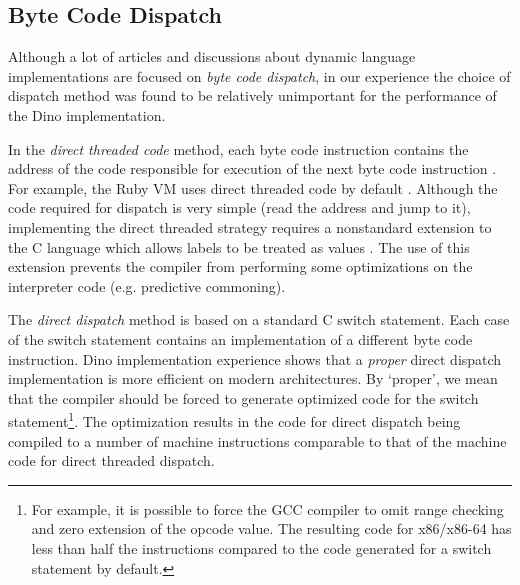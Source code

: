 \documentclass[preprint]{sigplanconf}
\begin{document}
\subsection{Byte Code Dispatch}

  Although a lot of articles and discussions about dynamic language
implementations are focused on \emph{byte code dispatch}, in our experience %
the choice of dispatch
method was found to be relatively unimportant for the performance of the Dino implementation.

  In the \emph{direct threaded code} method, each byte code
instruction contains the address of the code responsible for execution of
the next byte code instruction \cite{Bell} \cite{Ertl}.  For example, the Ruby VM
uses direct threaded code by default \cite{Sasada}.
Although the code required for dispatch is very simple (read the address and jump to it), implementing the direct threaded strategy requires a nonstandard extension to the C language which allows labels to be treated as values \cite{GCC}. The use of this extension prevents the compiler from performing some optimizations on the interpreter code (e.g. predictive commoning).

  The \emph{direct dispatch} method is based on a standard C switch
statement. Each case of the switch statement contains an implementation of a different byte code instruction. Dino implementation
experience shows that a \emph{proper} direct dispatch implementation is
more efficient on modern architectures. By `proper', we mean that the compiler
should be forced to generate optimized code for the switch statement\footnote{For example, it is possible to force the GCC compiler to omit range checking and zero extension of the opcode value. The resulting code for x86/x86-64 has less than half the instructions compared to the code generated for a switch statement by default.}. The optimization results in the code for direct dispatch being compiled to a number of machine instructions comparable to that of the machine code for direct threaded dispatch.
\end{document}
